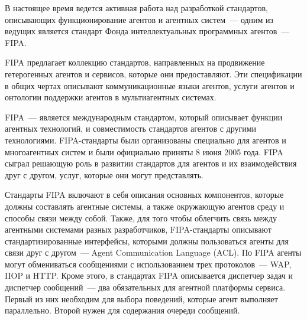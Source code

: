 В настоящее время ведется активная работа над разработкой стандартов, описывающих функционирование агентов и агентных систем~--- одним из ведущих является стандарт Фонда интеллектуальных программных агентов~--- FIPA.

FIPA предлагает коллекцию стандартов, направленных на продвижение гетерогенных агентов и сервисов, которые они предоставляют. Эти спецификации в общих чертах описывают коммуникационные языки агентов, услуги агентов и онтологии поддержки агентов в мультиагентных системах.

FIPA~--- является международным стандартом, который описывает функции агентных технологий, и совместимость стандартов агентов с другими технологиями. FIPA-стандарты были организованы специально для агентов и многоагентных систем и были официально приняты 8 июня 2005 года. FIPA сыграл решающую роль в развитии стандартов для агентов и их взаимодействия друг с другом, услуг, которые они могут представлять.

Стандарты FIPA включают в себя описания основных компонентов, которые должны составлять агентные системы, а также окружающую агентов среду и способы связи между собой. Также, для того чтобы облегчить связь между агентными системами разных разработчиков, FIPA-стандарты описывают стандартизированные интерфейсы, которыми должны пользоваться агенты для связи друг с другом~--- Agent Communication Language (ACL). По FIPA агенты могут обмениваться сообщениями с использованием трех протоколов~--- WAP, IIOP и  HTTP. Кроме этого, в стандартах FIPA описывается диспетчер задач и диспетчер сообщений~--- два обязательных для агентной платформы сервиса. Первый из них необходим для выбора поведений, которые агент выполняет параллельно. Второй нужен для содержания очереди сообщений.
